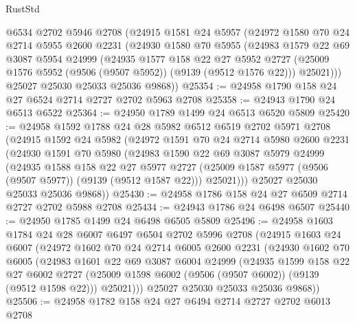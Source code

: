 \begin{lexlean}{RustStd}
\begin{coremodule}
    @6534
    @2702
    @5946
    @2708
    (@24915
      @1581
      @24
      @5957
      (@24972
        @1580
        @70
        @24
        @2714
        @5955
        @2600
        @2231
        (@24930
          @1580
          @70
          @5955
          (@24983
            @1579
            @22
            @69
            @3087
            @5954
            @24999
            (@24935
              @1577
              @158
              @22
              @27
              @5952
              @2727
              (@25009 @1576 @5952 (@9506 (@9507 @5952)) (@9139 (@9512 @1576 @22)))
              @25021)))
        @25027
        @25030
        @25033
        @25036
        @9868))
@25354 := @24958 @1790 @158 @24 @27 @6524 @2714 @2727 @2702 @5963 @2708
@25358 := @24943 @1790 @24 @6513 @6522
@25364 := @24950 @1789 @1499 @24 @6513 @6520 @5809
@25420 := @24958
    @1592
    @1788
    @24
    @28
    @5982
    @6512
    @6519
    @2702
    @5971
    @2708
    (@24915
      @1592
      @24
      @5982
      (@24972
        @1591
        @70
        @24
        @2714
        @5980
        @2600
        @2231
        (@24930
          @1591
          @70
          @5980
          (@24983
            @1590
            @22
            @69
            @3087
            @5979
            @24999
            (@24935
              @1588
              @158
              @22
              @27
              @5977
              @2727
              (@25009 @1587 @5977 (@9506 (@9507 @5977)) (@9139 (@9512 @1587 @22)))
              @25021)))
        @25027
        @25030
        @25033
        @25036
        @9868))
@25430 := @24958 @1786 @158 @24 @27 @6509 @2714 @2727 @2702 @5988 @2708
@25434 := @24943 @1786 @24 @6498 @6507
@25440 := @24950 @1785 @1499 @24 @6498 @6505 @5809
@25496 := @24958
    @1603
    @1784
    @24
    @28
    @6007
    @6497
    @6504
    @2702
    @5996
    @2708
    (@24915
      @1603
      @24
      @6007
      (@24972
        @1602
        @70
        @24
        @2714
        @6005
        @2600
        @2231
        (@24930
          @1602
          @70
          @6005
          (@24983
            @1601
            @22
            @69
            @3087
            @6004
            @24999
            (@24935
              @1599
              @158
              @22
              @27
              @6002
              @2727
              (@25009 @1598 @6002 (@9506 (@9507 @6002)) (@9139 (@9512 @1598 @22)))
              @25021)))
        @25027
        @25030
        @25033
        @25036
        @9868))
@25506 := @24958 @1782 @158 @24 @27 @6494 @2714 @2727 @2702 @6013 @2708

\end{coremodule}
\end{lexlean}
